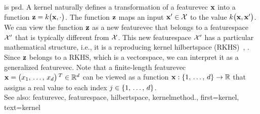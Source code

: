 {{	 	is \gls{psd}. 
     		A kernel naturally defines a transformation of a \gls{featurevec} ${\bf x}$ into a 
	 	\gls{function} ${\bf z} = k\big({\bf x},\cdot\big)$. The \gls{function} ${\bf z}$ maps an  
	 	input ${\bf x}' \in \mathcal{X}$ to the value $k\big({\bf x},{\bf x}'\big)$. 
	 	We can view the \gls{function} ${\bf z}$ as a new \gls{featurevec} that belongs to a 
	 	\gls{featurespace} $\mathcal{X}'$ that is typically different from $\mathcal{X}$. 
	 	This new \gls{featurespace} $\mathcal{X}'$ has a particular mathematical structure, i.e., it is a 
	 	reproducing kernel \gls{hilbertspace} (RKHS)~\cite{LearningKernelsBook}, \cite{LampertNowKernel}.
     		Since ${\bf z}$ belongs to a RKHS, which is a \gls{vectorspace}, we can interpret it as a generalized 
	 	\gls{featurevec}. Note that a finite-length \gls{featurevec} ${\bf x}=\big(x_{1}, \,\ldots, \,x_{d} \big)\,^{T} \in \mathbb{R}^{d}$ 
	 	can be viewed as a \gls{function} ${\bf x}: \{1, \,\ldots, \,d\} \rightarrow \mathbb{R}$ 
	 	that assigns a real value to each index $j \in \{1, \,\ldots, \,d\}$.
          		\\
		See also: \gls{featurevec}, \gls{featurespace}, \gls{hilbertspace}, \gls{kernelmethod}.},
	first={kernel},
	text={kernel} 
}
	
